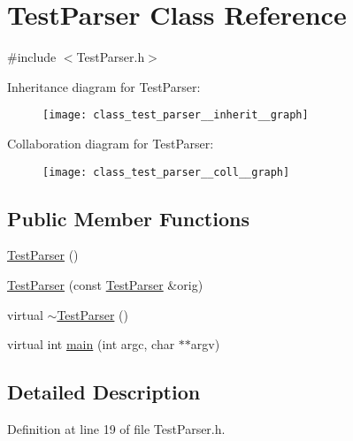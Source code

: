 \hypertarget{class_test_parser}{\section{Test\-Parser Class Reference}
\label{class_test_parser}
}


{\ttfamily \#include $<$Test\-Parser.\-h$>$}



Inheritance diagram for Test\-Parser\-:
\nopagebreak
\begin{figure}[H]
\begin{center}
\leavevmode
\texttt{[image: class\_test\_parser\_\_inherit\_\_graph]}
\end{center}
\end{figure}


Collaboration diagram for Test\-Parser\-:
\nopagebreak
\begin{figure}[H]
\begin{center}
\leavevmode
\texttt{[image: class\_test\_parser\_\_coll\_\_graph]}
\end{center}
\end{figure}
\subsection*{Public Member Functions}
\begin{DoxyCompactItemize}
\item 
\hyperlink{class_test_parser_a3056c42aee6e9d0a64dabb003ca305b5}{Test\-Parser} ()
\item 
\hyperlink{class_test_parser_a6405f855bb9ef1b4db53de578fb46ea0}{Test\-Parser} (const \hyperlink{class_test_parser}{Test\-Parser} \&orig)
\item 
virtual \hyperlink{class_test_parser_a17368a4484872afc8e4c13ca98d0932e}{$\sim$\-Test\-Parser} ()
\item 
virtual int \hyperlink{class_test_parser_ae1421b04c5b7420e8d542ebefe46f70e}{main} (int argc, char $\ast$$\ast$argv)
\end{DoxyCompactItemize}


\subsection{Detailed Description}


Definition at line 19 of file Test\-Parser.\-h.



